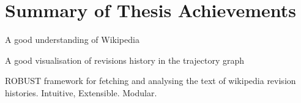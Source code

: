 \section{Summary of Thesis Achievements}

A good understanding of Wikipedia

A good visualisation of revisions history in the trajectory graph

ROBUST framework for fetching and analysing the text of wikipedia
revision histories. Intuitive, Extensible. Modular. 
